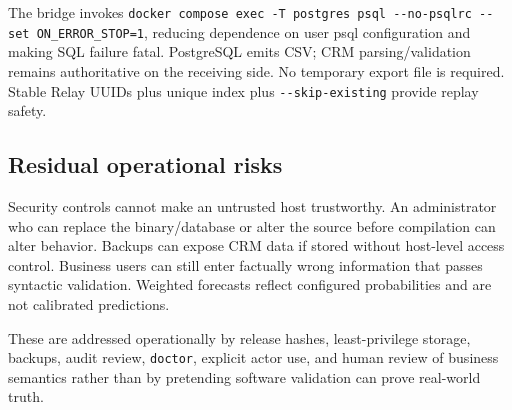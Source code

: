 \documentclass[
]{article}
\begin{document}
The bridge invokes
\texttt{docker\ compose\ exec\ -T\ postgres\ psql\ -\/-no-psqlrc\ -\/-set\ ON\_ERROR\_STOP=1},
reducing dependence on user psql configuration and making SQL failure
fatal. PostgreSQL emits CSV; CRM parsing/validation remains
authoritative on the receiving side. No temporary export file is
required. Stable Relay UUIDs plus unique index plus
\texttt{-\/-skip-existing} provide replay safety.

\subsection{Residual operational
risks}\label{residual-operational-risks}

Security controls cannot make an untrusted host trustworthy. An
administrator who can replace the binary/database or alter the source
before compilation can alter behavior. Backups can expose CRM data if
stored without host-level access control. Business users can still enter
factually wrong information that passes syntactic validation. Weighted
forecasts reflect configured probabilities and are not calibrated
predictions.

These are addressed operationally by release hashes, least-privilege
storage, backups, audit review, \texttt{doctor}, explicit actor use, and
human review of business semantics rather than by pretending software
validation can prove real-world truth.
\end{document}
